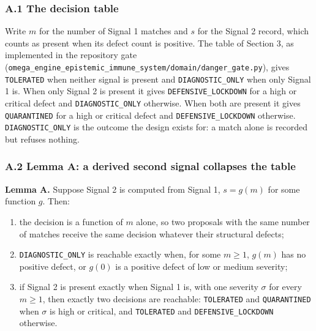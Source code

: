 \documentclass[
  11pt,
]{article}
\newcommand{\passthrough}[1]{#1}
\providecommand{\tightlist}{%
  \setlength{\itemsep}{0pt}\setlength{\parskip}{0pt}}
\begin{document}
\subsubsection{A.1 The decision table}\label{a.1-the-decision-table}

Write \(m\) for the number of Signal 1 matches and \(s\) for the Signal
2 record, which counts as present when its defect count is positive. The
table of Section 3, as implemented in the repository gate
(\nolinkurl{omega_engine_epistemic_immune_system/domain/danger_gate.py}),
gives \passthrough{\lstinline!TOLERATED!} when neither signal is present
and \nolinkurl{DIAGNOSTIC_ONLY} when only Signal 1 is. When only Signal
2 is present it gives \nolinkurl{DEFENSIVE_LOCKDOWN} for a high or
critical defect and \nolinkurl{DIAGNOSTIC_ONLY} otherwise. When both are
present it gives \passthrough{\lstinline!QUARANTINED!} for a high or
critical defect and \nolinkurl{DEFENSIVE_LOCKDOWN} otherwise.
\nolinkurl{DIAGNOSTIC_ONLY} is the outcome the design exists for: a
match alone is recorded but refuses nothing.

\subsubsection{A.2 Lemma A: a derived second signal collapses the
table}\label{a.2-lemma-a-a-derived-second-signal-collapses-the-table}

\textbf{Lemma A.} Suppose Signal 2 is computed from Signal 1,
\(s = g(m)\) for some function \(g\). Then:

\begin{enumerate}
\def\labelenumi{\arabic{enumi}.}
\tightlist
\item
  the decision is a function of \(m\) alone, so two proposals with the
  same number of matches receive the same decision whatever their
  structural defects;
\item
  \nolinkurl{DIAGNOSTIC_ONLY} is reachable exactly when, for some
  \(m \geq 1\), \(g(m)\) has no positive defect, or \(g(0)\) is a
  positive defect of low or medium severity;
\item
  if Signal 2 is present exactly when Signal 1 is, with one severity
  \(\sigma\) for every \(m \geq 1\), then exactly two decisions are
  reachable: \passthrough{\lstinline!TOLERATED!} and
  \passthrough{\lstinline!QUARANTINED!} when \(\sigma\) is high or
  critical, and \passthrough{\lstinline!TOLERATED!} and
  \nolinkurl{DEFENSIVE_LOCKDOWN} otherwise.
\end{enumerate}
\end{document}
